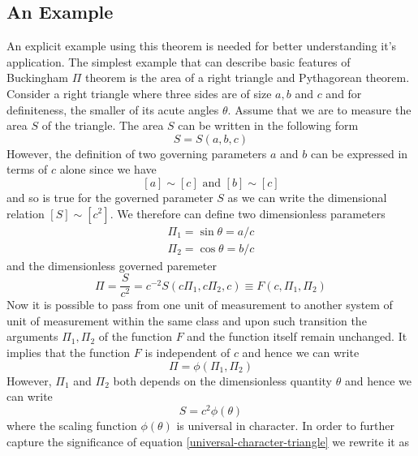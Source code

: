 	\subsection{An Example}
	An explicit example using this theorem is needed for better understanding it's application. The simplest example that can describe basic features of Buckingham $\Pi$ theorem is the area of a right triangle and Pythagorean theorem. \\
	Consider a right triangle where three sides are of size $a,b$ and $c$ and for definiteness, the smaller of its acute angles $\theta$. Assume that we are to measure the area $S$ of the triangle. The area $S$ can be written in the following form
	\begin{equation}
		S=S(a,b,c)
	\end{equation}
	However, the definition of two governing parameters $a$ and $b$ can be expressed in terms of $c$ alone since we have
	\begin{equation}
		\left[a\right] \sim \left[c\right] \text{ and } 
		\left[b\right] \sim \left[c\right]
	\end{equation}
	and so is true for the governed parameter $S$ as we can write the dimensional relation $\left[S\right] \sim \left[c^2\right]$. We therefore can define two dimensionless parameters
	\begin{align}
		\Pi_1 = \sin \theta = a/c \\
		\Pi_2 = \cos \theta = b/c
	\end{align}
	and the dimensionless governed paremeter
	\begin{equation}
		\Pi = \frac{S}{c^2} = c^{-2} S(c\Pi_1, c\Pi_2,c) \equiv F(c, \Pi_1, \Pi_2)
	\end{equation}
	Now it is possible to pass from one unit of measurement to another system of unit of measurement within the same class and upon such transition the arguments $\Pi_1, \Pi_2$ of the function $F$ and the function itself remain unchanged. It implies that the function $F$ is independent of $c$ and hence we can write
	\begin{equation}
		\Pi = \phi(\Pi_1, \Pi_2)
	\end{equation}
	However, $\Pi_1$ and $\Pi_2$ both depends on the dimensionless quantity $\theta$ and hence we can write 
	\begin{equation}
		S = c^2 \phi(\theta)
		\label{universal-character-triangle}
	\end{equation}
	where the scaling function $\phi(\theta)$ is universal in character. In order to further capture the significance of equation \ref{universal-character-triangle} we rewrite it as

